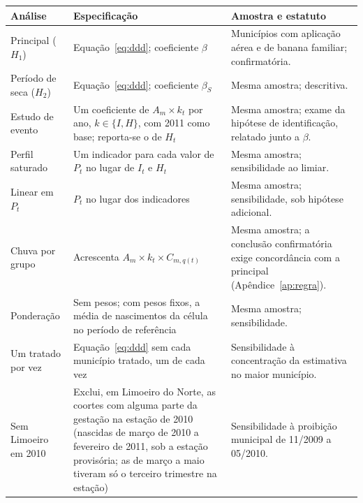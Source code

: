 \begin{apendicesenv}
\begin{quadro}[htb]
\caption{\label{qua:espec}Especificações do desenho de calendário}
\centering
\footnotesize
\begin{tabular}{@{}p{3.4cm}p{6.0cm}p{5.1cm}@{}}
\toprule
Análise & Especificação & Amostra e estatuto \\
\midrule
Principal ($H_1$) & Equação~\ref{eq:ddd}; coeficiente $\beta$ & Municípios com aplicação aérea e de banana familiar; confirmatória. \\
Período de seca ($H_2$) & Equação~\ref{eq:ddd}; coeficiente $\beta_S$ & Mesma amostra; descritiva. \\
Estudo de evento & Um coeficiente de $A_m \times k_t$ por ano, $k \in \{I,H\}$, com 2011 como base; reporta-se o de $H_t$ & Mesma amostra; exame da hipótese de identificação, relatado junto a $\beta$. \\
Perfil saturado & Um indicador para cada valor de $P_t$ no lugar de $I_t$ e $H_t$ & Mesma amostra; sensibilidade ao limiar. \\
Linear em $P_t$ & $P_t$ no lugar dos indicadores & Mesma amostra; sensibilidade, sob hipótese adicional. \\
Chuva por grupo & Acrescenta $A_m \times k_t \times C_{m,q(t)}$ & Mesma amostra; a conclusão confirmatória exige concordância com a principal (Apêndice~\ref{ap:regra}). \\
Ponderação & Sem pesos; com pesos fixos, a média de nascimentos da célula no período de referência & Mesma amostra; sensibilidade. \\
Um tratado por vez & Equação~\ref{eq:ddd} sem cada município tratado, um de cada vez & Sensibilidade à concentração da estimativa no maior município. \\
Sem Limoeiro em 2010 & Exclui, em Limoeiro do Norte, as coortes com alguma parte da gestação na estação de 2010 (nascidas de março de 2010 a fevereiro de 2011, sob a estação provisória; as de março a maio tiveram só o terceiro trimestre na estação) & Sensibilidade à proibição municipal de 11/2009 a 05/2010. \\
\bottomrule
\end{tabular}
\end{quadro}


\end{apendicesenv}
